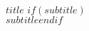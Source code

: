 \thispagestyle{firststyle}
~\vspace{1cm}
\begin{center}
\textbf{\Huge $title$}
$if(subtitle)$\\\textbf{\Large $subtitle$}$endif$
\end{center}